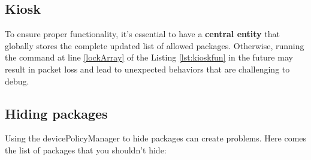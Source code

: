 \clearpage
\subsection{Kiosk}
\label{sec:kiosk}

To ensure proper functionality, it's essential to have a \textbf{central entity} that globally stores the complete updated list of allowed packages. Otherwise, running the command at line \ref{lockArray} of the Listing \ref{lst:kioskfun} in the future may result in packet loss and lead to unexpected behaviors that are challenging to debug.



\subsection{Hiding packages}

Using the devicePolicyManager to hide packages can create problems. Here comes the list of packages that you shouldn't hide:

